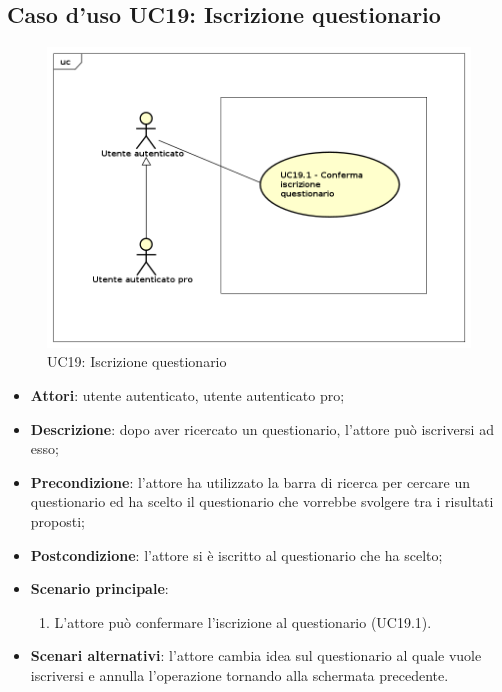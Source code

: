 \newpage
\subsection{Caso d'uso UC19: Iscrizione questionario}
\label{UC19}
\begin{figure}[h]
\centering
\includegraphics[scale=0.5,keepaspectratio]{UML/UC19.png}
\caption{UC19: Iscrizione questionario}
\end{figure}
\FloatBarrier
\begin{itemize}
\item\textbf{Attori}: utente autenticato, utente autenticato pro;
\item\textbf{Descrizione}: dopo aver ricercato un questionario, l'attore può iscriversi ad esso;
\item\textbf{Precondizione}: l'attore ha utilizzato la barra di ricerca per cercare un questionario ed ha scelto il questionario che vorrebbe svolgere tra i risultati proposti;
\item\textbf{Postcondizione}: l'attore si è iscritto al questionario che ha scelto;
\item\textbf{Scenario principale}:
\begin{enumerate}
\item L'attore può confermare l'iscrizione al questionario (UC19.1).
\end{enumerate} 
\item\textbf{Scenari alternativi}: l'attore cambia idea sul questionario al quale vuole iscriversi e annulla l'operazione tornando alla schermata precedente.
\end{itemize}


